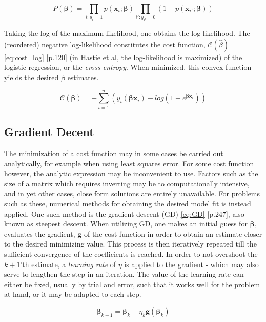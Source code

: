 \documentclass[%
oneside,                 %
final,                   %
10pt]{article}
\begin{document}
\begin{equation}
P(\bm{\beta})=\displaystyle\prod_{i:y_i=1}p(\bm{x}_i; \bm{\beta}) \displaystyle\prod_{i':y_{i'}=0}(1-p(\bm{x}_{i'}; \bm{\beta}))
\label{eq:max_likelihood}
\end{equation}

Taking the log of the maximum likelihood, one obtains the log-likelihood. The (reordered) negative log-likelihood constitutes the cost function, $\mathcal{C}(\hat {{\beta}})$ \eqref{eq:cost_log} \citep{HastieTrevor2009TEoS}[p.120] (in Hastie et al, the log-likelihood is maximized) of the logistic regression, or the \textit{cross entropy}. When minimized, this convex function yields the desired $\beta$ estimates.

\begin{equation}
\mathcal{C}(\bm{\beta})=-\sum_{i=1}^n \left(y_i({\bm{\beta}}\bm{x}_i)-log(1+e^{{\bm{\beta}}\bm{x}_i})\right)
\label{eq:cost_log}
\end{equation}

\subsection{Gradient Decent}  \label{Section_M_GD}
The minimization of a cost function may in some cases be carried out analytically, for example when using least squares error. For some cost function however, the analytic expression may be inconvenient to use. Factors such as the size of a matrix which requires inverting may be to computationally intensive, and in yet other cases, close form solutions are entirely unavailable. For problems such as these, numerical methods for obtaining the desired model fit is instead applied. One such method is the gradient descent (GD) \eqref{eq:GD} \citep{MLMurphy}[p.247], also known as steepest descent. When utilizing GD, one makes an initial guess for $\bm{\beta}$, evaluates the gradient, $\bm g$ of the cost function in order to obtain an estimate closer to the desired minimizing value. This process is then iteratively repeated till the sufficient convergence of the coefficients is reached. In order to not overshoot the $k+1$'th estimate, a \textit{learning rate} of $\eta$ is applied to the gradient - which may also serve to lengthen the step in an iteration. The value of the learning rate can either be fixed, usually by trial and error, such that it works well for the problem at hand, or it may be adapted to each step. 

\begin{equation}
\bm{\beta}_{k+1}=\bm{\beta}_{k}-\eta_k  \bm g (\bm{\beta}_k)
\label{eq:GD}
\end{equation}
\end{document}
